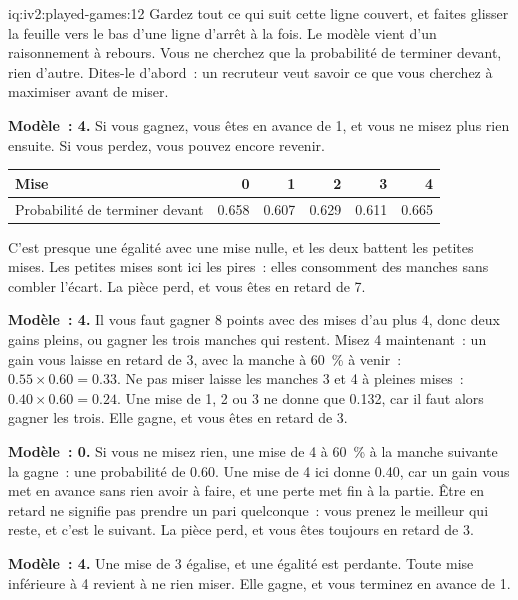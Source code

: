 \begin{solution}{iq:iv2:played-games:12}
Gardez tout ce qui suit cette ligne couvert, et faites glisser la feuille vers le bas d'une ligne d'arrêt à la fois. Le modèle vient d'un raisonnement à rebours. Vous ne cherchez que la probabilité de terminer devant, rien d'autre. Dites-le d'abord~: un recruteur veut savoir ce que vous cherchez à maximiser avant de miser.

\ivstop
\textbf{Modèle~: 4.} Si vous gagnez, vous êtes en avance de 1, et vous ne misez plus rien ensuite. Si vous perdez, vous pouvez encore revenir.
\begin{center}\small
\begin{tabular}{@{}l*{5}{r}@{}}
Mise & 0 & 1 & 2 & 3 & 4 \\ \hline
Probabilité de terminer devant & 0.658 & 0.607 & 0.629 & 0.611 & 0.665
\end{tabular}
\end{center}
C'est presque une égalité avec une mise nulle, et les deux battent les petites mises. Les petites mises sont ici les pires~: elles consomment des manches sans combler l'écart. La pièce perd, et vous êtes en retard de 7.

\ivstop
\textbf{Modèle~: 4.} Il vous faut gagner 8 points avec des mises d'au plus 4, donc deux gains pleins, ou gagner les trois manches qui restent. Misez 4 maintenant~: un gain vous laisse en retard de 3, avec la manche à 60~\% à venir~: $0.55 \times 0.60 = 0.33$. Ne pas miser laisse les manches 3 et 4 à pleines mises~: $0.40 \times 0.60 = 0.24$. Une mise de 1, 2 ou 3 ne donne que 0.132, car il faut alors gagner les trois. Elle gagne, et vous êtes en retard de 3.

\ivstop
\textbf{Modèle~: 0.} Si vous ne misez rien, une mise de 4 à 60~\% à la manche suivante la gagne~: une probabilité de 0.60. Une mise de 4 ici donne 0.40, car un gain vous met en avance sans rien avoir à faire, et une perte met fin à la partie. Être en retard ne signifie pas prendre un pari quelconque~: vous prenez le meilleur qui reste, et c'est le suivant. La pièce perd, et vous êtes toujours en retard de 3.

\ivstop
\textbf{Modèle~: 4.} Une mise de 3 égalise, et une égalité est perdante. Toute mise inférieure à 4 revient à ne rien miser. Elle gagne, et vous terminez en avance de 1.


\end{solution}

